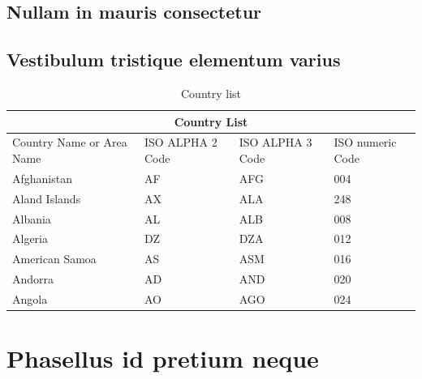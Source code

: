 \subsection{Nullam in mauris consectetur}
\blindtext
\blindenumerate

\subsection{Vestibulum tristique elementum varius}
\blindtext

\begin{table}[!ht]
	\caption{Country list}\label{t:1}
	\smallskip
	\centering

	\begin{tabular}{ |p{3cm}||p{3cm}|p{3cm}|p{3cm}|  }
		\hline
		\multicolumn{4}{|c|}{Country List} \\
		\hline
		Country Name or Area Name& ISO ALPHA 2 Code &ISO ALPHA 3 Code&ISO numeric Code\\
		\hline
		Afghanistan & AF & AFG & 004\\
		Aland Islands & AX & ALA & 248\\
		Albania & AL & ALB & 008\\
		Algeria & DZ & DZA & 012\\
		American Samoa & AS & ASM & 016\\
		Andorra & AD & AND & 020\\
		Angola & AO & AGO & 024\\
		\hline
	\end{tabular}
\end{table}


\section{Phasellus id pretium neque}
\Blindtext
